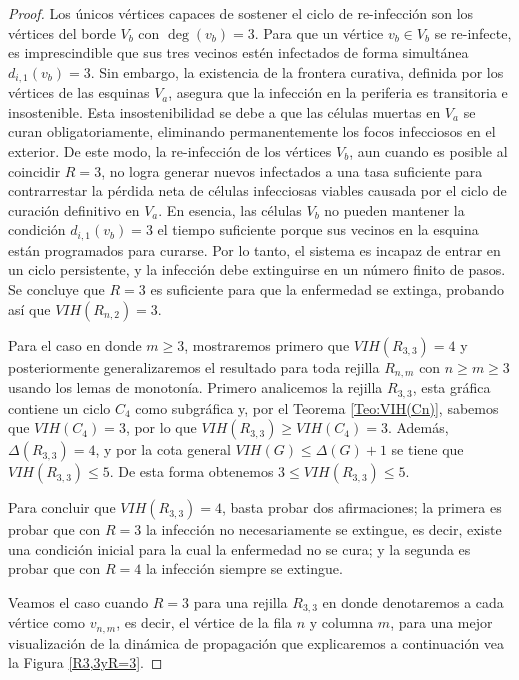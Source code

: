 \documentclass[12pt,titlepage,twoside,openright]{book}
\begin{document}
\begin{proof}
    Los \'unicos v\'ertices capaces de sostener el ciclo de re-infecci\'on son los v\'ertices del borde $V_b$ con $\deg(v_b)=3$. Para que un v\'ertice $v_b \in V_b$ se re-infecte, es imprescindible que sus tres vecinos est\'en infectados de forma simult\'anea $d_{i,1}(v_b)=3$. Sin embargo, la existencia de la frontera curativa, definida por los v\'ertices de las esquinas $V_a$, asegura que la infecci\'on en la periferia es transitoria e insostenible. Esta insostenibilidad se debe a que las c\'elulas muertas en $V_a$ se curan obligatoriamente, eliminando permanentemente los focos infecciosos en el exterior. De este modo, la re-infecci\'on de los v\'ertices $V_b$, aun cuando es posible al coincidir $R=3$, no logra generar nuevos infectados a una tasa suficiente para contrarrestar la p\'erdida neta de c\'elulas infecciosas viables causada por el ciclo de curaci\'on definitivo en $V_a$. En esencia, las c\'elulas $V_b$ no pueden mantener la condici\'on $d_{i,1}(v_b)=3$ el tiempo suficiente porque sus vecinos en la esquina est\'an programados para curarse. Por lo tanto, el sistema es incapaz de entrar en un ciclo persistente, y la infecci\'on debe extinguirse en un n\'umero finito de pasos. Se concluye que $R=3$ es suficiente para que la enfermedad se extinga, probando as\'i que $VIH(R_{n,2})=3$.

    Para el caso en donde $m\ge 3$, mostraremos primero que $VIH(R_{3,3})=4$ y posteriormente generalizaremos el resultado para toda rejilla $R_{n,m}$ con $n\ge m\ge 3$ usando los lemas de monoton\'ia. Primero analicemos la rejilla $R_{3,3}$, esta gr\'afica contiene un ciclo $C_4$ como subgr\'afica y, por el Teorema \ref{Teo:VIH(Cn)}, sabemos que $VIH(C_4)=3$, por lo que $VIH(R_{3,3})\ge VIH(C_4)=3$. Adem\'as, $\Delta(R_{3,3})=4$, y por la cota general $VIH(G)\le \Delta(G)+1$ se tiene que $VIH(R_{3,3})\le 5$. De esta forma obtenemos $3\le VIH(R_{3,3})\le 5$.

    Para concluir que $VIH(R_{3,3})=4$, basta probar dos afirmaciones; la primera es probar que con $R=3$ la infecci\'on no necesariamente se extingue, es decir, existe una condici\'on inicial para la cual la enfermedad no se cura; y la segunda es probar que con $R=4$ la infecci\'on siempre se extingue.

    Veamos el caso cuando $R=3$ para una rejilla $R_{3,3}$ en donde denotaremos a cada v\'ertice como $v_{n,m}$, es decir, el v\'ertice de la fila $n$ y columna $m$, para una mejor visualizaci\'on de la din\'amica de propagaci\'on que explicaremos a continuaci\'on vea la Figura \ref{R3,3yR=3}.
    

\end{proof}
\end{document}
